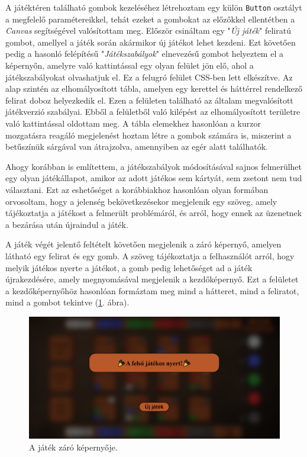 
A játéktéren található gombok kezeléséhez létrehoztam egy külön \texttt{Button} osztályt a megfelelő paramétereikkel, tehát ezeket a gombokat az előzőkkel ellentétben a \textit{Canvas} segítségével valósítottam meg. Először csináltam egy "\textit{Új játék}" feliratú gombot, amellyel a játék során akármikor új játékot lehet kezdeni. Ezt követően pedig a hasonló felépítésű "\textit{Játékszabályok}" elnevezésű gombot helyeztem el a képernyőn, amelyre való kattintással egy olyan felület jön elő, ahol a játékszabályokat olvashatjuk el. Ez a felugró felület CSS-ben lett elkészítve. Az alap szintén az elhomályosított tábla, amelyen egy kerettel és háttérrel rendelkező felirat doboz helyezkedik el. Ezen a felületen található az általam megvalósított játékverzió szabályai. Ebből a felületből való kilépést az elhomályosított területre való kattintással oldottam meg. A tábla elemekhez hasonlóan a kurzor mozgatásra reagáló megjelenést hoztam létre a gombok számára is, miszerint a betűszínük sárgával van átrajzolva, amennyiben az egér alatt találhatók.



Ahogy korábban is említettem, a játékszabályok módosításával sajnos felmerülhet egy olyan játékállapot, amikor az adott játékos sem kártyát, sem zsetont nem tud választani. Ezt az eshetőséget a korábbiakhoz hasonlóan olyan formában orvosoltam, hogy a jelenség bekövetkezésekor megjelenik egy szöveg, amely tájékoztatja a játékost a felmerült problémáról, és arról, hogy ennek az üzenetnek a bezárása után újraindul a játék.



A játék végét jelentő feltételt követően megjelenik a záró képernyő, amelyen látható egy felirat és egy gomb. A szöveg tájékoztatja a felhasználót arról, hogy melyik játékos nyerte a játékot, a gomb pedig lehetőséget ad a játék újrakezdésére, amely megnyomásával megjelenik a kezdőképernyő. Ezt a felületet a kezdőképernyőhöz hasonlóan formáztam meg mind a hátteret, mind a feliratot, mind a gombot tekintve (\ref{fig:end_screen}. ábra).

\begin{figure}[h]
\centering
\includegraphics[width=\textwidth]{images/end_screen.png}
\caption{A játék záró képernyője.}
\label{fig:end_screen}
\end{figure}

